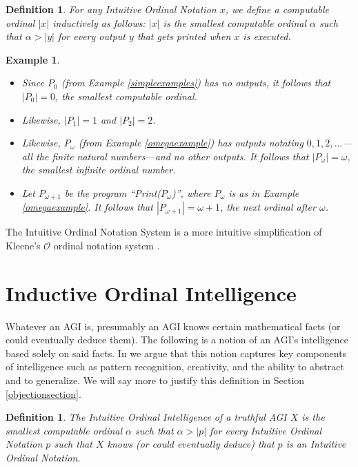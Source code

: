\documentclass[runningheads]{llncs}
\newtheorem{myexample}[mytheorem]{Example}
\newtheorem{mydefinition}[mytheorem]{Definition}
\begin{document}
\begin{mydefinition}
    For any Intuitive Ordinal Notation $x$, we define a computable ordinal $|x|$
    inductively as follows: $|x|$ is the smallest computable ordinal $\alpha$
    such that $\alpha>|y|$ for every output $y$ that gets printed when $x$ is
    executed.
\end{mydefinition}

\begin{myexample}
    \begin{itemize}
        \item
        Since $P_0$ (from Example \ref{simpleexamples}) has no outputs,
        it follows that $|P_0|=0$, the smallest computable ordinal.
        \item
        Likewise, $|P_1|=1$ and $|P_2|=2$.
        \item
        Likewise, $P_\omega$ (from Example \ref{omegaexample}) has outputs
        notating $0, 1, 2, \ldots$---all the finite natural numbers---and no
        other outputs. It follows that $|P_\omega|=\omega$, the smallest
        infinite ordinal number.
        \item
        Let $P_{\omega+1}$ be the program ``Print($P_\omega$)'',
        where $P_\omega$ is as in Example \ref{omegaexample}.
        It follows that $|P_{\omega+1}|=\omega+1$, the next ordinal after
        $\omega$.
    \end{itemize}
\end{myexample}

The Intuitive Ordinal Notation System is a more intuitive simplification of
Kleene's $\mathcal O$ ordinal notation system \cite{kleene1938notation}.

\section{Inductive Ordinal Intelligence}
\label{informalargumentsection}

Whatever an AGI is, presumably an AGI knows certain mathematical facts
(or could eventually deduce them).
The following is a notion of an AGI's intelligence based
solely on said facts. In \cite{alexander2019measuring}
we argue that this notion captures key components of intelligence such as
pattern recognition, creativity, and the ability to abstract and to
generalize. We will say more to justify this definition in
Section \ref{objectionsection}.

\begin{mydefinition}
\label{maindefinition}
    The \emph{Intuitive Ordinal Intelligence} of a truthful AGI $X$ is the smallest computable
    ordinal $\alpha$ such that $\alpha>|p|$ for every Intuitive Ordinal Notation
    $p$ such that $X$ knows (or could eventually deduce) that $p$ is an
    Intuitive Ordinal Notation.
\end{mydefinition}
\end{document}
